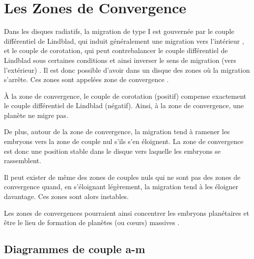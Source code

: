 \section{Les Zones de Convergence}
Dans les disques radiatifs, la migration de type I est gouvernée par le couple différentiel de Lindblad, qui induit généralement une migration vers l'intérieur \citep{tanaka2002three}, et le couple de corotation, qui peut contrebalancer le couple différentiel de Lindblad sous certaines conditions et ainsi inverser le sens de migration (vers l'extérieur) \citep{paardekooper2006halting, kley2008migration}. Il est donc possible d'avoir dans un disque des zones où la migration s'arrête. Ces zones sont appelées zone de convergence \citep[CZs;][]{lyra2010orbital, mordasini2011application, paardekooper2011torque}. 

\bigskip

À la zone de convergence, le couple de corotation (positif) compense exactement le couple différentiel de Lindblad (négatif). Ainsi, à la zone de convergence, une planète ne migre pas.

De plus, autour de la zone de convergence, la migration tend à ramener les embryons vers la zone de couple nul s'ils s'en éloignent. La zone de convergence est donc une position stable dans le disque vers laquelle les embryons se rassemblent.

Il peut exister de même des zones de couples nuls qui ne sont pas des zones de convergence quand, en s'éloignant légèrement, la migration tend à les éloigner davantage. Ces zones sont alors instables.

Les zones de convergences pourraient ainsi concentrer les embryons planétaires et être le lieu de formation de planètes (ou cœurs) massives \citep{lyra2010orbital, horn2012orbital}. 



\subsection{Diagrammes de couple a-m}\label{sec:migrations-maps}

